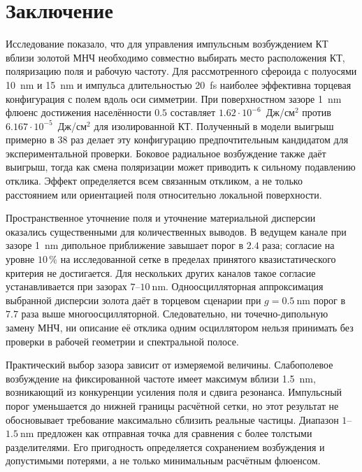 \section{Заключение}
\label{sec:conclusion}

Исследование показало, что для управления импульсным возбуждением КТ
вблизи золотой МНЧ необходимо совместно выбирать место расположения
КТ, поляризацию поля и рабочую частоту. Для рассмотренного сфероида
с полуосями \SI{10}{\nano\meter} и \SI{15}{\nano\meter} и импульса
длительностью \SI{20}{\femto\second} наиболее эффективна торцевая
конфигурация с полем вдоль оси симметрии. При поверхностном зазоре
\SI{1}{\nano\meter} флюенс достижения населённости $0.5$ составляет
$1.62\cdot10^{-6}$~Дж/см$^2$ против
$6.167\cdot10^{-5}$~Дж/см$^2$ для изолированной КТ.
Полученный в модели выигрыш примерно в $38$ раз делает эту
конфигурацию предпочтительным кандидатом для экспериментальной
проверки. Боковое радиальное возбуждение также даёт выигрыш,
тогда как смена поляризации может приводить к сильному подавлению
отклика. Эффект определяется всем связанным откликом, а не только
расстоянием или ориентацией поля относительно локальной поверхности.

Пространственное уточнение поля и уточнение материальной дисперсии
оказались существенными для количественных выводов. В ведущем канале
при зазоре \SI{1}{\nano\meter} дипольное приближение завышает порог
в $2.4$ раза; согласие на уровне $10\,\%$ на исследованной сетке
в пределах принятого квазистатического критерия не достигается.
Для нескольких других каналов такое согласие устанавливается
при зазорах $7$--$\SI{10}{\nano\meter}$. Одноосцилляторная
аппроксимация выбранной дисперсии золота даёт в торцевом
сценарии при $g=\SI{0.5}{\nano\meter}$ порог в $7.7$ раза выше
многоосцилляторной. Следовательно,
ни точечно-дипольную замену МНЧ, ни описание её отклика одним
осциллятором нельзя принимать без проверки в рабочей геометрии
и спектральной полосе.

Практический выбор зазора зависит от измеряемой величины.
Слабополевое возбуждение на фиксированной частоте имеет максимум
вблизи \SI{1.5}{\nano\meter}, возникающий из конкуренции усиления
поля и сдвига резонанса. Импульсный порог уменьшается до нижней
границы расчётной сетки, но этот результат не обосновывает
требование максимально сблизить реальные частицы. Диапазон
$1$--$\SI{1.5}{\nano\meter}$ предложен как отправная точка
для сравнения с более толстыми разделителями. Его пригодность
определяется сохранением возбуждения и допустимыми потерями,
а не только минимальным расчётным флюенсом.

